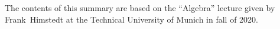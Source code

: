 
\begin{fullwidth}

\section*{}
The contents of this summary are based on the ``Algebra'' lecture given by \mbox{Frank Himstedt} at the Technical University of Munich in fall of 2020.

\vfill

\thispagestyle{empty}
\setlength{\parindent}{0pt}

\par\noindent\@title
\selectfont\par\noindent\@author
\selectfont\par\noindent\@date



\end{fullwidth}

